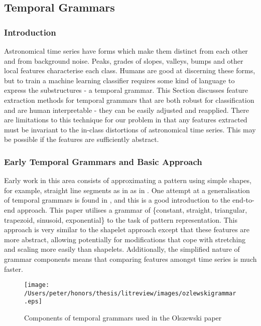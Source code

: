 	
	\subsection{Temporal Grammars}
	\subsubsection{Introduction}
	Astronomical time series have forms which make them distinct from each other and from background noise. Peaks, grades of slopes, valleys, bumps and other local features characterise each class. Humans are good at discerning these forms, but to train a machine learning classifier requires some kind of language to express the substructures - a temporal grammar. This Section discusses feature extraction methods for temporal grammars that are both robust for classification and are human interpretable - they can be easily adjusted and reapplied. There are limitations to this technique for our problem in that any features extracted must be invariant to the in-class distortions of astronomical time series. This may be possible if the features are sufficiently abstract.
	\subsubsection{Early Temporal Grammars and Basic Approach}
	Early work in this area consists of approximating a pattern using simple shapes, for example, straight line segments as in as in \citep{keogh1998enhanced}. One attempt at a generalisation of temporal grammars is found in \citep{olszewski2001generalized}, and this is a good introduction to the end-to-end approach. This paper utilises a grammar of \{constant, straight, triangular, trapezoid, sinusoid, exponential\} to the task of pattern representation. This approach is very similar to the shapelet approach except that these features are more abstract, allowing potentially for modifications that cope with stretching and scaling more easily than shapelets. Additionally, the simplified nature of grammar components means that comparing features amongst time series is much faster. 
	\begin{figure}[ht!]
	\centering
	\texttt{[image: /Users/peter/honors/thesis/litreview/images/ozlewskigrammar.eps]}
	\caption{Components of temporal grammars used in the Olszewski paper}
	\label{oslewskigrammar}
	\end{figure}
	
